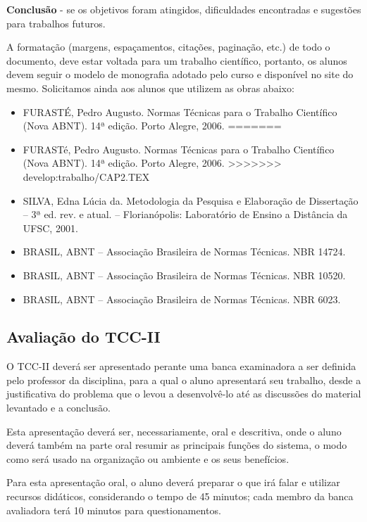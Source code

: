 \textbf{Conclusão} - se os objetivos foram atingidos, dificuldades encontradas e sugestões para trabalhos futuros.

A formatação (margens, espaçamentos, citações, paginação, etc.) de todo o documento, deve estar voltada para um trabalho científico, portanto, 
os alunos devem seguir o modelo de monografia adotado pelo curso e disponível no site do mesmo. 
Solicitamos ainda aos alunos que utilizem as obras abaixo:

	\begin{itemize}	
<<<<<<< HEAD:trabalho/CAP2.TEX
		\item  FURASTÉ, Pedro Augusto. Normas Técnicas para o Trabalho Científico (Nova ABNT). 14ª edição. Porto Alegre, 2006.
=======
		\item  FURAST\'e, Pedro Augusto. Normas T\'ecnicas para o Trabalho Científico (Nova ABNT). 14ª edição. Porto Alegre, 2006.
>>>>>>> develop:trabalho/CAP2.TEX

		\item SILVA, Edna Lúcia da. Metodologia da Pesquisa e Elaboração de Dissertação – 3ª ed. rev. e atual. – Florianópolis: Laboratório de Ensino a Distância da 			UFSC, 2001.

		\item BRASIL, ABNT – Associação Brasileira de Normas T\'ecnicas. NBR 14724.

		\item BRASIL, ABNT – Associação Brasileira de Normas T\'ecnicas. NBR 10520.

		\item BRASIL, ABNT – Associação Brasileira de Normas T\'ecnicas. NBR 6023.
	\end{itemize}


\subsection{Avaliação do TCC-II}

O TCC-II deverá ser apresentado perante uma banca examinadora a ser definida pelo professor da disciplina, para a qual o aluno apresentará seu trabalho, desde a justificativa do problema que o levou a desenvolvê-lo at\'e as discussões do material levantado e a conclusão.

Esta apresentação deverá ser, necessariamente, oral e descritiva, onde o aluno deverá tamb\'em na parte oral resumir as principais funções do sistema, o modo como será usado na organização ou ambiente e os seus benefícios.

Para esta apresentação oral, o aluno deverá preparar o que irá falar e utilizar recursos didáticos, considerando o tempo de 45 minutos; cada membro da banca avaliadora terá 10 minutos para questionamentos.

